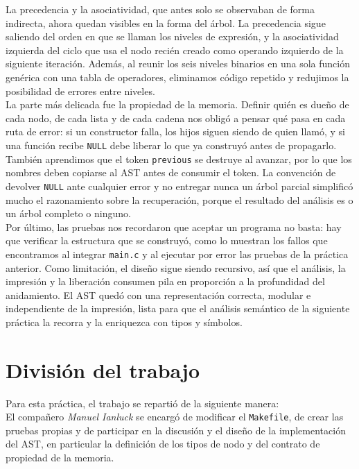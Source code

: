 \documentclass[12pt,letterpaper]{article}
\begin{document}
La precedencia y la asociatividad, que antes solo se observaban de forma indirecta, ahora quedan visibles en
la forma del árbol. La precedencia sigue saliendo del orden en que se llaman los niveles de expresión, y la
asociatividad izquierda del ciclo que usa el nodo recién creado como operando izquierdo de la siguiente
iteración. Además, al reunir los seis niveles binarios en una sola función genérica con una tabla de
operadores, eliminamos código repetido y redujimos la posibilidad de errores entre niveles.\\

La parte más delicada fue la propiedad de la memoria. Definir quién es dueño de cada nodo, de cada lista y de
cada cadena nos obligó a pensar qué pasa en cada ruta de error: si un constructor falla, los hijos siguen
siendo de quien llamó, y si una función recibe \texttt{NULL} debe liberar lo que ya construyó antes de
propagarlo. También aprendimos que el token \texttt{previous} se destruye al avanzar, por lo que los nombres
deben copiarse al AST antes de consumir el token. La convención de devolver \texttt{NULL} ante cualquier error
y no entregar nunca un árbol parcial simplificó mucho el razonamiento sobre la recuperación, porque el
resultado del análisis es o un árbol completo o ninguno.\\

Por último, las pruebas nos recordaron que aceptar un programa no basta: hay que verificar la estructura que
se construyó, como lo muestran los fallos que encontramos al integrar \texttt{main.c} y al ejecutar por
error las pruebas de la práctica anterior. Como limitación, el diseño sigue siendo recursivo, así que el
análisis, la impresión y la liberación consumen pila en proporción a la profundidad del anidamiento. El AST
quedó con una representación correcta, modular e independiente de la impresión, lista para que el análisis
semántico de la siguiente práctica la recorra y la enriquezca con tipos y símbolos.

\section*{División del trabajo}
Para esta práctica, el trabajo se repartió de la siguiente manera:\\

El compañero \textit{Manuel Ianluck} se encargó de modificar el \texttt{Makefile}, de crear las pruebas
propias y de participar en la discusión y el diseño de la implementación del AST, en particular la
definición de los tipos de nodo y del contrato de propiedad de la memoria.\\
\end{document}
